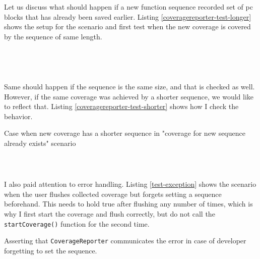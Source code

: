 \documentclass{elteikthesis}[2018/06/06]
\newcommand*{\code}{\lstinline[keywordstyle=\color{violet}, basicstyle=\color{violet}]}
\begin{document}
Let us discuss what should happen if a new function sequence recorded set of pc blocks that has already been saved earlier. Listing \ref{coveragereporter-test-longer} shows the setup for the scenario and first test when the new coverage is covered by the sequence of same length. \\

\begin{listing}
\caption{\label{coveragereporter-test-longer}Setup for scenario "coverage for new sequence already exists" in \code{test/coverageReporter-test.cpp}, and case when new coverage is reached with longer sequence compared to what was recorded earlier}
\inputminted[firstline=86,lastline=104]{c++}{test/coverageReporter-test.cpp} \\
\end{listing}

\begin{center}
\begin{tabular}{}
\\
\\
\end{tabular}
\end{center}

Same should happen if the sequence is the same size, and that is checked as well. However, if the same coverage was achieved by a shorter sequence, we would like to reflect that. Listing \ref{coveragereporter-test-shorter} shows how I check the behavior. \\

\begin{listing}
\caption{\label{coveragereporter-test-shorter}Case when new coverage has a shorter sequence in "coverage for new sequence already exists" scenario}
\inputminted[firstline=117,lastline=126]{c++}{test/coverageReporter-test.cpp} \\
\end{listing}


I also paid attention to error handling. Listing \ref{test-exception} shows the scenario when the user flushes collected coverage but forgets setting a sequence beforehand. This needs to hold true after flushing any number of times, which is why I first start the coverage and flush correctly, but do not call the \code{startCoverage()} function for the second time. \\

\begin{listing}
\caption{\label{test-exception}Asserting that \code{CoverageReporter} communicates the error in case of developer forgetting to set the sequence.}
\inputminted[firstline=129,lastline=139,breaklines]{c++}{test/coverageReporter-test.cpp} \\
\end{listing}
\end{document}
